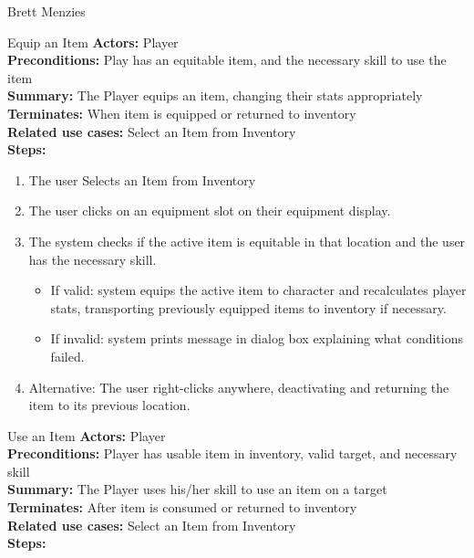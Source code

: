 \documentclass[12pt]{report}
\begin{document}
\begin{section}{Brett Menzies}

\begin{subsection}{Equip an Item}
\textbf{Actors:} Player \\
\textbf{Preconditions:} Play has an equitable item, and the necessary skill to use the item \\
\textbf{Summary:} The Player equips an item, changing their stats appropriately \\
\textbf{Terminates:} When item is equipped or returned to inventory \\
\textbf{Related use cases:} Select an Item from Inventory \\
\textbf{Steps:}

\begin{enumerate}
	\item The user Selects an Item from Inventory
	\item The user clicks on an equipment slot on their equipment display.
	\item The system checks if the active item is equitable in that location and the user has the necessary skill.
	\begin{itemize}
		\item If valid: system equips the active item to character and recalculates player stats,
			transporting previously equipped items to inventory if necessary.
		\item If invalid: system prints message in dialog box explaining what conditions failed.
	\end{itemize}
	\item Alternative: The user right-clicks anywhere, deactivating and returning the item to its previous location.
\end{enumerate}
\end{subsection}

\begin{subsection}{Use an Item}
\textbf{Actors:} Player \\
\textbf{Preconditions:} Player has usable item in inventory, valid target, and necessary skill \\
\textbf{Summary:} The Player uses his/her skill to use an item on a target \\
\textbf{Terminates:} After item is consumed or returned to inventory \\
\textbf{Related use cases:} Select an Item from Inventory \\
\textbf{Steps:}


\end{subsection}
\end{section}
\end{document}
